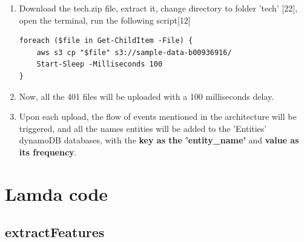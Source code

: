 \begin{enumerate}
    
        \item  Download the tech.zip file, extract it, change directory to folder 'tech' [22], open the terminal, run the following script[12]




\begin{mdframed}[linewidth=1pt]
\lstset{language=PowerShell}
\begin{lstlisting}[basicstyle=\ttfamily\small, breaklines=true]
foreach ($file in Get-ChildItem -File) {
    aws s3 cp "$file" s3://sample-data-b00936916/
    Start-Sleep -Milliseconds 100
}
\end{lstlisting}
\end{mdframed}

    \item Now, all the 401 files will be uploaded with a 100 milliseconds delay.
    \item Upon each upload, the flow of events mentioned in the architecture will be triggered, and all the names entities will be added to the 'Entities' dynamoDB databases, with the \textbf{key as the 'entity\_name' }and \textbf{value as its frequency}.
\end{enumerate}

\newpage
\section{Lamda code}
\subsection{extractFeatures}


